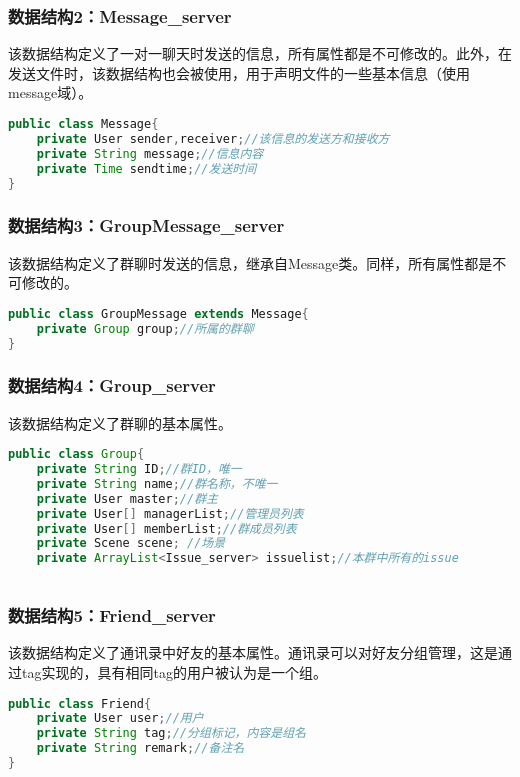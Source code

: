 \subsubsection{\color{red} 数据结构2：Message\_server}
该数据结构定义了一对一聊天时发送的信息，所有属性都是不可修改的。此外，在发送文件时，该数据结构也会被使用，用于声明文件的一些基本信息（使用message域）。
\begin{lstlisting}[language=Java, caption=Message定义]
public class Message{
    private User sender,receiver;//该信息的发送方和接收方
    private String message;//信息内容
    private Time sendtime;//发送时间
}
\end{lstlisting}

\subsubsection{\color{red} 数据结构3：GroupMessage\_server}
该数据结构定义了群聊时发送的信息，继承自Message类。同样，所有属性都是不可修改的。
\begin{lstlisting}[language=Java, caption=GroupMessage定义]
public class GroupMessage extends Message{
    private Group group;//所属的群聊
}
\end{lstlisting}

{\color{red}
\subsubsection{\color{red} 数据结构4：Group\_server}
该数据结构定义了群聊的基本属性。
\begin{lstlisting}[language=Java, caption=Group定义]
public class Group{
    private String ID;//群ID，唯一
    private String name;//群名称，不唯一
    private User master;//群主
    private User[] managerList;//管理员列表
    private User[] memberList;//群成员列表
    private Scene scene; //场景
    private ArrayList<Issue_server> issuelist;//本群中所有的issue
    
\end{lstlisting}
}


\subsubsection{\color{red} 数据结构5：Friend\_server}
该数据结构定义了通讯录中好友的基本属性。通讯录可以对好友分组管理，这是通过tag实现的，具有相同tag的用户被认为是一个组。
\begin{lstlisting}[language=Java, caption=Friend定义]
public class Friend{
    private User user;//用户
    private String tag;//分组标记，内容是组名
    private String remark;//备注名
}
\end{lstlisting}


